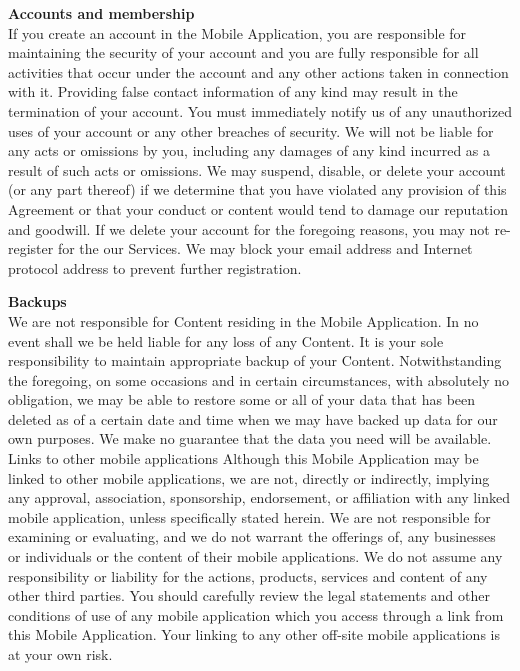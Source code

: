 \documentclass[letterpaper,10pt]{article}
\begin{document}
\begin{appendices}
\large{\textbf{Accounts and membership}} \\
If you create an account in the Mobile Application, you are responsible for maintaining the security of your account and you are fully responsible for all activities that occur under the account and any other actions taken in connection with it. Providing false contact information of any kind may result in the termination of your account. You must immediately notify us of any unauthorized uses of your account or any other breaches of security. We will not be liable for any acts or omissions by you, including any damages of any kind incurred as a result of such acts or omissions. We may suspend, disable, or delete your account (or any part thereof) if we determine that you have violated any provision of this Agreement or that your conduct or content would tend to damage our reputation and goodwill. If we delete your account for the foregoing reasons, you may not re-register for the our Services. We may block your email address and Internet protocol address to prevent further registration.

\large{\textbf{Backups}} \\
We are not responsible for Content residing in the Mobile Application. In no event shall we be held liable for any loss of any Content. It is your sole responsibility to maintain appropriate backup of your Content. Notwithstanding the foregoing, on some occasions and in certain circumstances, with absolutely no obligation, we may be able to restore some or all of your data that has been deleted as of a certain date and time when we may have backed up data for our own purposes. We make no guarantee that the data you need will be available.
Links to other mobile applications
Although this Mobile Application may be linked to other mobile applications, we are not, directly or indirectly, implying any approval, association, sponsorship, endorsement, or affiliation with any linked mobile application, unless specifically stated herein. We are not responsible for examining or evaluating, and we do not warrant the offerings of, any businesses or individuals or the content of their mobile applications. We do not assume any responsibility or liability for the actions, products, services and content of any other third parties. You should carefully review the legal statements and other conditions of use of any mobile application which you access through a link from this Mobile Application. Your linking to any other off-site mobile applications is at your own risk.


\end{appendices}
\end{document}
